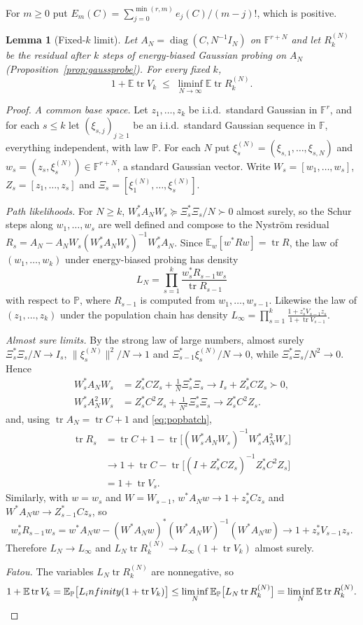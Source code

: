 \documentclass[11pt,a4paper]{article}
\newtheorem{lemma}[theorem]{Lemma}
\theoremstyle{definition}
\newcommand{\E}{\mathbb{E}}
\newcommand{\PP}{\mathbb{P}}
\newcommand{\F}{\mathbb{F}}
\newcommand{\tr}{\operatorname{tr}}
\newcommand{\diag}{\operatorname{diag}}
\begin{document}
For $m\ge0$ put $E_m(C)=\sum_{j=0}^{\min(r,m)}e_j(C)/(m-j)!$, which is positive.

\begin{lemma}[Fixed-$k$ limit]\label{lem:weak}
Let $A_N=\diag(C,N^{-1}I_N)$ on $\F^{r+N}$ and let $R^{(N)}_k$ be the residual after $k$ steps of energy-biased Gaussian probing on $A_N$ (Proposition~\ref{prop:gaussprobe}). For every fixed $k$,
\[
1+\E\tr V_k\;\le\;\liminf_{N\to\infty}\E\tr R^{(N)}_k .
\]
\end{lemma}

\begin{proof}
\emph{A common base space.} Let $z_1,\dots,z_k$ be i.i.d.\ standard Gaussian in $\F^r$, and for each $s\le k$ let $(\xi_{s,j})_{j\ge1}$ be an i.i.d.\ standard Gaussian sequence in $\F$, everything independent, with law $\PP$. For each $N$ put $\xi^{(N)}_s=(\xi_{s,1},\dots,\xi_{s,N})$ and $w_s=(z_s,\xi^{(N)}_s)\in\F^{r+N}$, a standard Gaussian vector. Write $W_s=[w_1,\dots,w_s]$, $Z_s=[z_1,\dots,z_s]$ and $\Xi_s=[\xi^{(N)}_1,\dots,\xi^{(N)}_s]$.

\emph{Path likelihoods.} For $N\ge k$, $W_s^*A_NW_s\succeq\Xi_s^*\Xi_s/N\succ0$ almost surely, so the Schur steps along $w_1,\dots,w_s$ are well defined and compose to the Nystr\"om residual $R_s=A_N-A_NW_s(W_s^*A_NW_s)^{-1}W_s^*A_N$. Since $\E_w[w^*Rw]=\tr R$, the law of $(w_1,\dots,w_k)$ under energy-biased probing has density
\[
L_N=\prod_{s=1}^k\frac{w_s^*R_{s-1}w_s}{\tr R_{s-1}}
\]
with respect to $\PP$, where $R_{s-1}$ is computed from $w_1,\dots,w_{s-1}$. Likewise the law of $(z_1,\dots,z_k)$ under the population chain has density $L_\infty=\prod_{s=1}^k\frac{1+z_s^*V_{s-1}z_s}{1+\tr V_{s-1}}$.

\emph{Almost sure limits.} By the strong law of large numbers, almost surely $\Xi_s^*\Xi_s/N\to I_s$, $\|\xi^{(N)}_s\|^2/N\to1$ and $\Xi_{s-1}^*\xi^{(N)}_s/N\to0$, while $\Xi_s^*\Xi_s/N^2\to0$. Hence
\begin{align*}
W_s^*A_NW_s
&=Z_s^*CZ_s+\tfrac1N\Xi_s^*\Xi_s
 \longrightarrow I_s+Z_s^*CZ_s\succ0,\\
W_s^*A_N^2W_s
&=Z_s^*C^2Z_s+\tfrac1{N^2}\Xi_s^*\Xi_s
 \longrightarrow Z_s^*C^2Z_s.
\end{align*}
and, using $\tr A_N=\tr C+1$ and \eqref{eq:popbatch},
\begin{align*}
\tr R_s
&=\tr C+1-\tr\big[(W_s^*A_NW_s)^{-1}W_s^*A_N^2W_s\big]\\
&\longrightarrow1+\tr C
 -\tr\big[(I+Z_s^*CZ_s)^{-1}Z_s^*C^2Z_s\big]\\
&=1+\tr V_s.
\end{align*}
Similarly, with $w=w_s$ and $W=W_{s-1}$, $w^*A_Nw\to1+z_s^*Cz_s$ and $W^*A_Nw\to Z_{s-1}^*Cz_s$, so
\[
w_s^*R_{s-1}w_s=w^*A_Nw-(W^*A_Nw)^*(W^*A_NW)^{-1}(W^*A_Nw)\to1+z_s^*V_{s-1}z_s .
\]
Therefore $L_N\to L_\infty$ and $L_N\tr R^{(N)}_k\to L_\infty(1+\tr V_k)$ almost surely.

\emph{Fatou.} The variables $L_N\tr R^{(N)}_k$ are nonnegative, so
\[
1+\E\tr V_k=\E_\PP\big[L_\infty(1+\tr V_k)\big]\le\liminf_N\E_\PP\big[L_N\tr R^{(N)}_k\big]=\liminf_N\E\tr R^{(N)}_k.\qedhere
\]
\end{proof}
\end{document}
